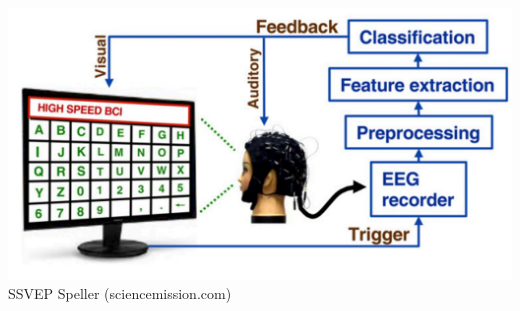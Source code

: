 \documentclass[landscape,final,a1paper,fontscale=0.4]{../baposter/baposter}
\begin{document}
\begin{poster}
{	\begin{center}
		\includegraphics[scale=0.3]{images/ssvep_example.png}\newline
		SSVEP Speller (sciencemission.com)
	\end{center}
   
}
    
    
  
    

\end{poster}
\end{document}
